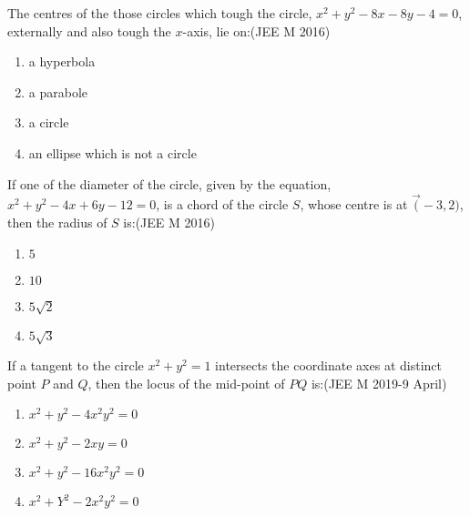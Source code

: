          \item The centres of the those circles which tough the circle, $x^2+y^2-8x-8y-4=0$, externally and also tough the $x$-axis, lie on:\hfill(JEE M 2016)
    \begin{enumerate}
        \item a hyperbola\\
        \item a parabole\\
        \item a circle\\
        \item an ellipse which is not a circle\\
    \end{enumerate}
        \item  If one of the diameter of the circle, given by the equation, $x^2+y^2-4x+6y-12=0$, is a chord of the circle $S$, whose centre is at $\vec(-3,2)$, then the radius of $S$ is:\hfill(JEE M 2016)
    \begin{enumerate}
         \item $5$\\
         \item $10$\\
         \item $5\sqrt{2}$\\
         \item $5\sqrt{3}$\\
    \end{enumerate}
        \item If a tangent to the circle $x^2+y^2=1$ intersects the coordinate axes at distinct point $P$ and $Q$, then the locus of the mid-point of $PQ$ is:\hfil(JEE M 2019-9 April)
    \begin{enumerate}
         \item ${x^2+y^2-4x^2y^2}=0$\\
         \item ${x^2+y^2-2xy}=0$\\
         \item ${x^2+y^2-16x^2y^2}=0$\\
         \item ${x^2+Y^2-2x^2y^2}=0$\\
    \end{enumerate}

